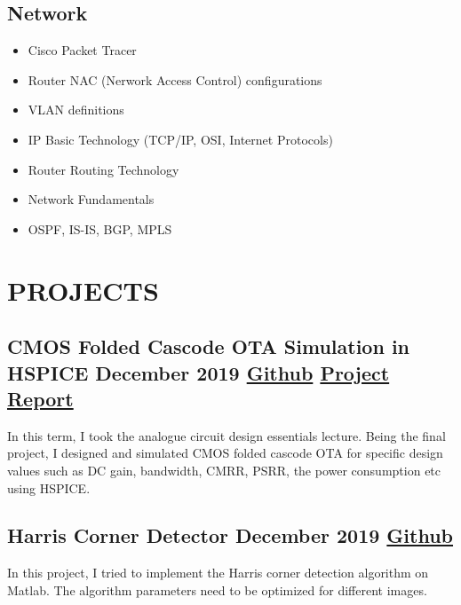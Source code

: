\documentclass[10pt]{article}
\begin{document}
\subsection{Network}
\vspace{1em}
\begin{itemize}
 \justifying
   
\itemsep1em
\item Cisco Packet Tracer
\item Router NAC (Nerwork Access Control) configurations
\item VLAN definitions

\item IP Basic Technology (TCP/IP, OSI, Internet Protocols)

\item     Router Routing Technology
 \item    Network Fundamentals
 \item    OSPF, IS-IS, BGP,  MPLS


\end{itemize} 
\vspace{10em}
\section{PROJECTS}
\subsection{CMOS Folded Cascode OTA Simulation in HSPICE December 2019 \textcolor{Mycolor3}{\href{https://github.com/Zrrck/CMOS-Folded-Cascode-OTA-Simulation-in-HSPICE-}{\small{Github}}} \textcolor{Mycolor4}{\href{https://github.com/Zrrck/CMOS-Folded-Cascode-OTA-Simulation-in-HSPICE-/blob/master/ASDE_Report.pdf}{\small{Project Report}}}}
In this term, I took the analogue circuit design essentials lecture. Being the final project, I designed and simulated CMOS folded cascode OTA for specific design values such as DC gain, bandwidth, CMRR, PSRR, the power consumption etc using HSPICE.
\subsection{Harris Corner Detector December 2019 
\textcolor{Mycolor3}{\href{https://github.com/Zrrck/Harris-Corner-Detection}{\small{Github}}}} 
In this project, I tried to implement the Harris corner detection algorithm on Matlab. The algorithm parameters need to be optimized for different images.
\end{document}
